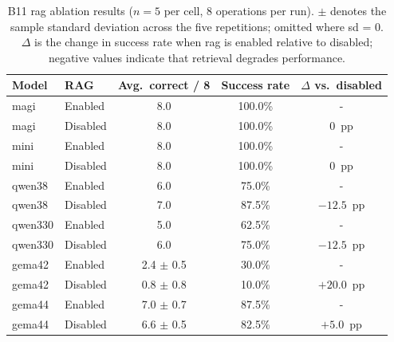 \documentclass[
     12pt,
     a4paper,
     BCOR=10mm,
     DIV=14,
     listof=totoc,
     bibliography=totoc,
     parskip,
     twoside,
     headsepline
     ]{scrreprt}
\begin{document}
\begin{table}[ht]
	\centering
	\begin{tabular}{llccc}
		\hline
		\textbf{Model}        & \textbf{RAG}                    & \textbf{Avg.\ correct / 8} &
		\textbf{Success rate} & \textbf{$\Delta$ vs.\ disabled}                                                     \\
		\hline
		\gls{magi}            & Enabled                         & 8.0                        & 100.0\% & -          \\
		\gls{magi}            & Disabled                        & 8.0                        & 100.0\% & $0$~pp     \\
		\hline
		\gls{mini}            & Enabled                         & 8.0                        & 100.0\% & -          \\
		\gls{mini}            & Disabled                        & 8.0                        & 100.0\% & $0$~pp     \\
		\hline
		\gls{qwen38}          & Enabled                         & 6.0                        & 75.0\%  & -          \\
		\gls{qwen38}          & Disabled                        & 7.0                        & 87.5\%  & $-12.5$~pp \\
		\hline
		\gls{qwen330}         & Enabled                         & 5.0                        & 62.5\%  & -          \\
		\gls{qwen330}         & Disabled                        & 6.0                        & 75.0\%  & $-12.5$~pp \\
		\hline
		\gls{gema42}          & Enabled                         & 2.4 $\pm$ 0.5              & 30.0\%  & -          \\
		\gls{gema42}          & Disabled                        & 0.8 $\pm$ 0.8              & 10.0\%  & $+20.0$~pp \\
		\hline
		\gls{gema44}          & Enabled                         & 7.0 $\pm$ 0.7              & 87.5\%  & -          \\
		\gls{gema44}          & Disabled                        & 6.6 $\pm$ 0.5              & 82.5\%  & $+5.0$~pp  \\
		\hline
	\end{tabular}
	\caption{B11 \gls{rag} ablation results ($n = 5$ per cell, 8 operations per run). $\pm$ denotes the sample standard deviation across the five repetitions; omitted where \gls{sd} = 0. $\Delta$ is the change in success rate when \gls{rag} is enabled relative to disabled; negative values indicate that retrieval degrades performance.}
	\label{tab:b11-results}
\end{table}
\end{document}
